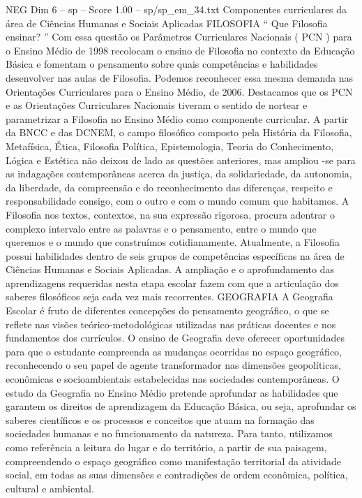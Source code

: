 \begin{textsample}{NEG Dim 6 – sp – Score 1.00 – sp/sp\_em\_34.txt}  \label{ex:f6_neg_204}
Componentes curriculares da área de Ciências Humanas e Sociais Aplicadas FILOSOFIA “ Que Filosofia ensinar? ” Com essa questão os Parâmetros Curriculares Nacionais ( PCN ) para o Ensino Médio de 1998 recolocam o ensino de Filosofia no contexto da Educação Básica e fomentam o pensamento sobre quais competências e habilidades desenvolver nas aulas de Filosofia.
Podemos reconhecer essa mesma demanda nas Orientações Curriculares para o Ensino Médio, de 2006.
Destacamos que os PCN e as Orientações Curriculares Nacionais tiveram o sentido de nortear e parametrizar a Filosofia no Ensino Médio como componente curricular.
A partir da BNCC e das DCNEM, o campo filosófico composto pela História da Filosofia, Metafísica, Ética, Filosofia Política, Epistemologia, Teoria do Conhecimento, Lógica e Estética não deixou de lado as questões anteriores, mas ampliou -se para as indagações contemporâneas acerca da justiça, da solidariedade, da autonomia, da liberdade, da compreensão e do reconhecimento das diferenças, respeito e responsabilidade consigo, com o outro e com o mundo comum que habitamos.
A Filosofia nos textos, contextos, na sua expressão rigorosa, procura adentrar o complexo intervalo entre as palavras e o pensamento, entre o mundo que queremos e o mundo que construímos cotidianamente.
Atualmente, a Filosofia possui habilidades dentro de seis grupos de competências específicas na área de Ciências Humanas e Sociais Aplicadas.
A ampliação e o aprofundamento das aprendizagens requeridas nesta etapa escolar fazem com que a articulação dos saberes filosóficos seja cada vez mais recorrentes.
GEOGRAFIA A Geografia Escolar é fruto de diferentes concepções do pensamento geográfico, o que se reflete nas visões teórico-metodológicas utilizadas nas práticas docentes e nos fundamentos dos currículos.
O ensino de Geografia deve oferecer oportunidades para que o estudante compreenda as mudanças ocorridas no espaço geográfico, reconhecendo o seu papel de agente transformador nas dimensões geopolíticas, econômicas e socioambientais estabelecidas nas sociedades contemporâneas.
O estudo da Geografia no Ensino Médio pretende aprofundar as habilidades que garantem os direitos de aprendizagem da Educação Básica, ou seja, aprofundar os saberes científicos e os processos e conceitos que atuam na formação das sociedades humanas e no funcionamento da natureza.
Para tanto, utilizamos como referência a leitura do lugar e do território, a partir de sua paisagem, compreendendo o espaço geográfico como manifestação territorial da atividade social, em todas as suas dimensões e contradições de ordem econômica, política, cultural e ambiental.

\end{textsample}
